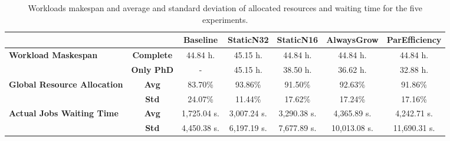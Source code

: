 \documentclass[a4paper,fleqn]{cas-dc}
\begin{document}
\begin{table}[htbp]
    \fontsize{9.5pt}{20pt}\selectfont
    \centering
    \begin{tabular}{lcccccc}
        \toprule
         & & \textbf{Baseline} & \textbf{StaticN32} & \textbf{StaticN16} & \textbf{AlwaysGrow} & \textbf{ParEfficiency} \\
        \midrule
        \multirow{2}{*}{\textbf{Workload Maskespan}} 
            & \textbf{Complete}     & 44.84 h.      & 45.15 h.   & 44.84 h.   & 44.84 h.   & 44.84 h. \\
            & \textbf{Only PhD}     & -             & 45.15 h.   & 38.50 h.   & 36.62 h.   & 32.88 h. \\
        \midrule
        \multirow{2}{*}{\textbf{Global Resource Allocation}} 
            & \textbf{Avg}     & 83.70\%     & 93.86\%   & 91.50\%   & 92.63\%   & 91.86\% \\
            & \textbf{Std}    & 24.07\%     & 11.44\%   & 17.62\%   & 17.24\%   & 17.16\% \\
        \midrule
        \multirow{2}{*}{\textbf{Actual Jobs Waiting Time}}
            & \textbf{Avg}     & 1,725.04 s.    & 3,007.24 s.     & 3,290.38 s.    & 4,365.89 s.     & 4,242.71 s.         \\
            & \textbf{Std}     & 4,450.38 s.    & 6,197.19  s.    & 7,677.89 s.    & 10,013.08 s.    & 11,690.31 s.        \\
        \bottomrule
    \end{tabular}
    \caption{Workloads makespan and average and standard deviation of allocated resources and waiting time for the five experiments.}
    \label{tab:alloc-wait}
\end{table}

\end{document}
